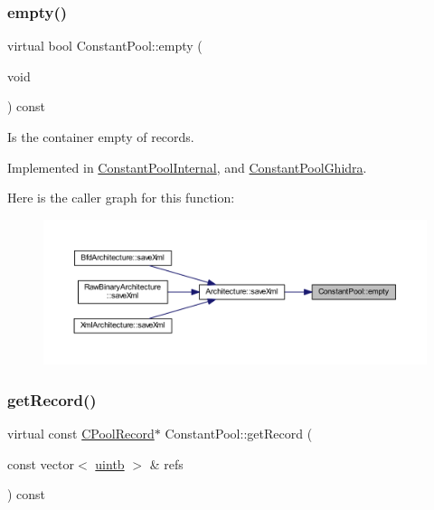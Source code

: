 \mbox{\label{class_constant_pool_a22bef84ddc137d871c05a55c5757a3e1}} 
\subsubsection{\texorpdfstring{empty()}{empty()}}
{\footnotesize\ttfamily virtual bool Constant\+Pool\+::empty (\begin{DoxyParamCaption}\item[{void}]{ }\end{DoxyParamCaption}) const\hspace{0.3cm}{\ttfamily [pure virtual]}}



Is the container empty of records. 



Implemented in \mbox{\hyperlink{class_constant_pool_internal_a4de2decea0379233ebd272c8eb72355d}{Constant\+Pool\+Internal}}, and \mbox{\hyperlink{class_constant_pool_ghidra_a224351241fabcf4ebb2a0d2701b63e40}{Constant\+Pool\+Ghidra}}.

Here is the caller graph for this function\+:
\nopagebreak
\begin{figure}[H]
\begin{center}
\leavevmode
\includegraphics[width=350pt]{class_constant_pool_a22bef84ddc137d871c05a55c5757a3e1_icgraph}
\end{center}
\end{figure}
\mbox{\label{class_constant_pool_ac17df35ff1376311f62912d29bf26cad}} 
\subsubsection{\texorpdfstring{getRecord()}{getRecord()}}
{\footnotesize\ttfamily virtual const \mbox{\hyperlink{class_c_pool_record}{C\+Pool\+Record}}$\ast$ Constant\+Pool\+::get\+Record (\begin{DoxyParamCaption}\item[{const vector$<$ \mbox{\hyperlink{types_8h_a2db313c5d32a12b01d26ac9b3bca178f}{uintb}} $>$ \&}]{refs }\end{DoxyParamCaption}) const\hspace{0.3cm}{\ttfamily [pure virtual]}}



